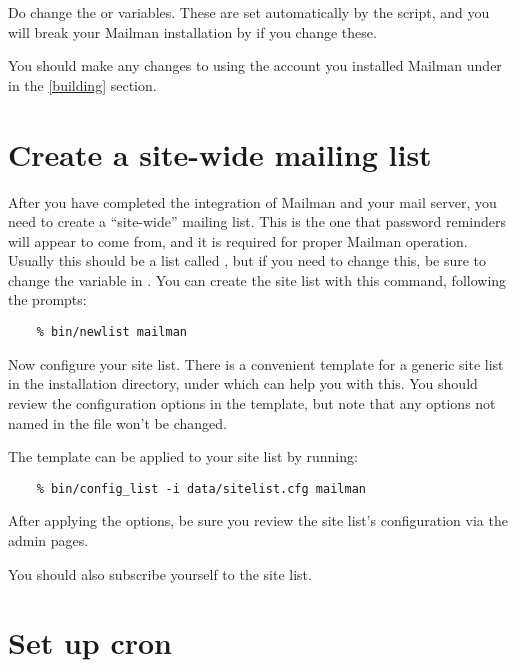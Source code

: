 \documentclass{howto}
\begin{document}
\begin{notice}[note]
Do  change the  or  variables.
These are set automatically by the  script, and you will
break your Mailman installation by if you change these.
\end{notice}

You should make any changes to  using the account you
installed Mailman under in the \ref{building} section.

\section{Create a site-wide mailing list}

After you have completed the integration of Mailman and your mail server, you
need to create a ``site-wide'' mailing list.  This is the one that password
reminders will appear to come from, and it is required for proper Mailman
operation.  Usually this should be a list called , but if you
need to change this, be sure to change the  variable in
.  You can create the site list with this command, following
the prompts:

\begin{verbatim}
    % bin/newlist mailman
\end{verbatim}

Now configure your site list.  There is a convenient template for a generic
site list in the installation directory, under  which
can help you with this.  You should review the configuration options in the
template, but note that any options not named in the  file
won't be changed.

The template can be applied to your site list by
running:

\begin{verbatim}
    % bin/config_list -i data/sitelist.cfg mailman
\end{verbatim}

After applying the  options, be sure you review the
site list's configuration via the admin pages.

You should also subscribe yourself to the site list.

\section{Set up cron}
\end{document}
